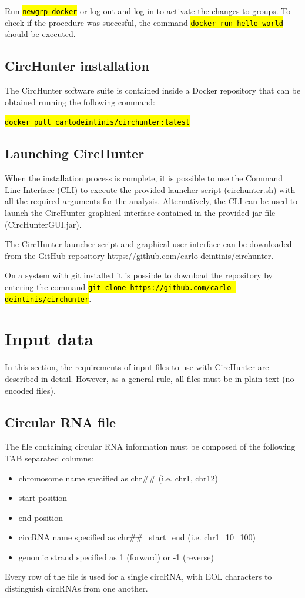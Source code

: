 \documentclass[letterpaper,12pt]{article}
\newcommand{\code}[1]{\hl{\texttt{#1}}}
\newcommand{\github}{https://github.com/carlo-deintinis/circhunter}
\begin{document}
\bigskip

Run \code{newgrp docker} or log out and log in to activate the changes to groups. To check if the procedure was succesful, the command \code{docker run hello-world} should be executed.
 
\subsection{CircHunter installation}

The CircHunter software suite is contained inside a Docker repository that can be obtained running the following command:

\bigskip

\noindent\code{docker pull carlodeintinis/circhunter:latest}

\subsection{Launching CircHunter}

When the installation process is complete, it is possible to use the Command Line Interface (CLI) to execute the provided launcher script (circhunter.sh) with all the required arguments for the analysis. Alternatively, the CLI can be used to launch the CircHunter graphical interface contained in the provided jar file (CircHunterGUI.jar).

\bigskip

The CircHunter launcher script and graphical user interface can be downloaded from the GitHub repository \github.

On a system with git installed it is possible to download the repository by entering the command \code{git clone \hbox\github}.

\section{Input data}
\label{sec:input_data}
In this section, the requirements of input files to use with CircHunter are described in detail. However, as a general rule, all files must be in plain text (no encoded files).

\subsection{Circular RNA file}

The file containing circular RNA information must be composed of the following TAB separated columns:
\begin{itemize}
  \item chromosome name specified as chr\#\# (i.e. chr1, chr12)
  \item start position
  \item end position
  \item circRNA name specified as chr\#\#\_start\_end (i.e. chr1\_10\_100)
  \item genomic strand specified as 1 (forward) or -1 (reverse)
\end{itemize}
Every row of the file is used for a single circRNA, with EOL characters to distinguish circRNAs from one another.
\end{document}

